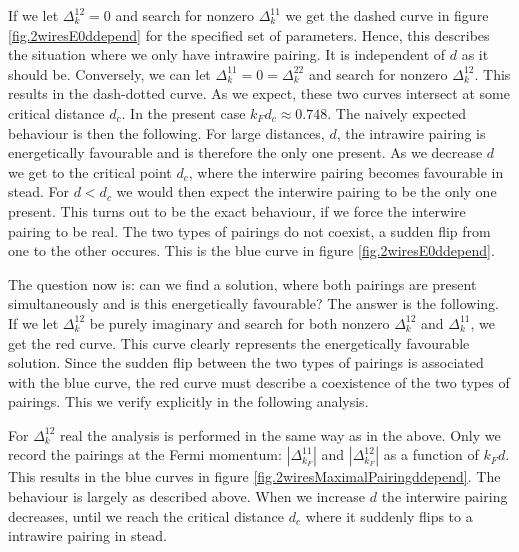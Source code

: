 If we let $\Delta^{12}_k = 0$ and search for nonzero $\Delta^{11}_k$ we get the dashed curve in figure \ref{fig.2wiresE0ddepend} for the specified set of parameters. Hence, this describes the situation where we only have intrawire pairing. It is independent of $d$ as it should be. Conversely, we can let $\Delta^{11}_k = 0 = \Delta^{22}_k$ and search for nonzero $\Delta^{12}_k$. This results in the dash-dotted curve. As we expect, these two curves intersect at some critical distance $d_c$. In the present case $k_Fd_c \approx 0.748$. The naively expected behaviour is then the following. For large distances, $d$, the intrawire pairing is energetically favourable and is therefore the only one present. As we decrease $d$ we get to the critical point $d_c$, where the interwire pairing becomes favourable in stead. For $d < d_c$ we would then expect the interwire pairing to be the only one present. This turns out to be the exact behaviour, if we force the interwire pairing to be real. The two types of pairings do not coexist, a sudden flip from one to the other occures. This is the blue curve in figure \ref{fig.2wiresE0ddepend}. 

The question now is: can we find a solution, where both pairings are present simultaneously and is this energetically favourable? The answer is the following. If we let $\Delta^{12}_k$ be purely imaginary and search for both nonzero $\Delta^{12}_k$ and $\Delta^{11}_k$, we get the red curve. This curve clearly represents the energetically favourable solution. Since the sudden flip between the two types of pairings is associated with the blue curve, the red curve must describe a coexistence of the two types of pairings. This we verify explicitly in the following analysis. 

For $\Delta^{12}_k$ real the analysis is performed in the same way as in the above. Only we record the pairings at the Fermi momentum: $\left|\Delta^{11}_{k_F}\right|$ and $\left|\Delta^{12}_{k_F}\right|$ as a function of $k_Fd$. This results in the blue curves in figure \ref{fig.2wiresMaximalPairingddepend}. The behaviour is largely as described above. When we increase $d$ the interwire pairing decreases, until we reach the critical distance $d_c$ where it suddenly flips to a intrawire pairing in stead. 

